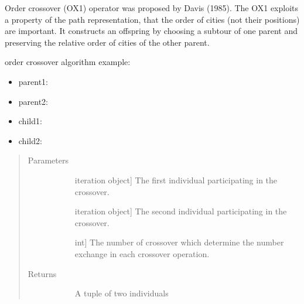 \documentclass[letterpaper,10pt,english]{sphinxmanual}
\begin{document}
\begin{fulllineitems}
\label{\detokenize{pygace:pygace.ga.order_crossover}}
Order crossover (OX1) operator was proposed by Davis (1985). The OX1 exploits
a property of the path representation, that the order of cities (not their
positions) are important. It constructs an offspring by choosing a subtour
of one parent and preserving the relative order of cities of the other
parent.

order crossover algorithm example:
\begin{itemize}
\item {} 
parent1: 

\item {} 
parent2: 

\item {} 
child1: 

\item {} 
child2: 

\end{itemize}
\begin{quote}\begin{description}
\item[{Parameters}] \leavevmode\begin{description}
\item[{}] \leavevmode{[}iteration object{]}
The first individual participating in the crossover.

\item[{}] \leavevmode{[}iteration object{]}
The second individual participating in the crossover.

\item[{}] \leavevmode{[}int{]}
The number of crossover which determine the number exchange in each
crossover operation.

\end{description}

\item[{Returns}] \leavevmode\begin{description}
\item[{}] \leavevmode
A tuple of two individuals


\end{description}
\end{description}
\end{quote}
\end{fulllineitems}
\end{document}
